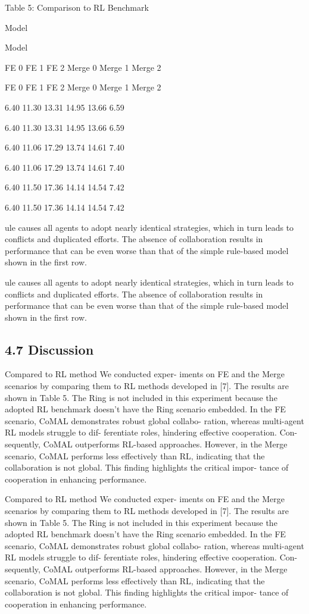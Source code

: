 \documentclass[12pt]{article}
\begin{document}
Table 5: Comparison to RL Benchmark


Model


Model


FE 0 FE 1 FE 2 Merge 0 Merge 1 Merge 2


FE 0 FE 1 FE 2 Merge 0 Merge 1 Merge 2


6.40
11.30
13.31
14.95
13.66
6.59


6.40
11.30
13.31
14.95
13.66
6.59


6.40
11.06
17.29
13.74
14.61
7.40


6.40
11.06
17.29
13.74
14.61
7.40


6.40
11.50
17.36
14.14
14.54
7.42


6.40
11.50
17.36
14.14
14.54
7.42


ule causes all agents to adopt nearly identical strategies,
which in turn leads to conflicts and duplicated efforts.
The absence of collaboration results in performance that
can be even worse than that of the simple rule-based
model shown in the first row.


ule causes all agents to adopt nearly identical strategies,
which in turn leads to conflicts and duplicated efforts.
The absence of collaboration results in performance that
can be even worse than that of the simple rule-based
model shown in the first row.


\subsection{4.7 Discussion}


Compared to RL method We conducted exper-
iments on FE and the Merge scenarios by comparing
them to RL methods developed in [7]. The results
are shown in Table 5. The Ring is not included in
this experiment because the adopted RL benchmark
doesn’t have the Ring scenario embedded.
In the FE
scenario, CoMAL demonstrates robust global collabo-
ration, whereas multi-agent RL models struggle to dif-
ferentiate roles, hindering effective cooperation. Con-
sequently, CoMAL outperforms RL-based approaches.
However, in the Merge scenario, CoMAL performs less
effectively than RL, indicating that the collaboration is
not global. This finding highlights the critical impor-
tance of cooperation in enhancing performance.


Compared to RL method We conducted exper-
iments on FE and the Merge scenarios by comparing
them to RL methods developed in [7]. The results
are shown in Table 5. The Ring is not included in
this experiment because the adopted RL benchmark
doesn’t have the Ring scenario embedded.
In the FE
scenario, CoMAL demonstrates robust global collabo-
ration, whereas multi-agent RL models struggle to dif-
ferentiate roles, hindering effective cooperation. Con-
sequently, CoMAL outperforms RL-based approaches.
However, in the Merge scenario, CoMAL performs less
effectively than RL, indicating that the collaboration is
not global. This finding highlights the critical impor-
tance of cooperation in enhancing performance.
\end{document}
